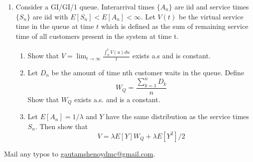 \documentclass[a4paper,10pt]{article}
\begin{document}
\begin{enumerate}
\item Consider a GI/GI/1 queue. Interarrival times $\{A_n\}$ are iid and service times $\{S_n\}$ are iid with $E[S_n] < E[A_n] < \infty$. Let $V(t)$ be the virtual service time in the queue at time $t$ which is defined as the sum of remaining service time of all customers present in the system at time t. 
\begin{enumerate}
	\item Show that $V = \lim_{t \to \infty}\frac{\int_0^t V(u)du}{t}$ exists a.s and is constant.
	\item Let $D_n$ be the amount of time nth customer waits in the queue. Define
	\[W_Q = \frac{\sum_{k=1}^n D_k}{n}\]
	Show that $W_Q$ exists a.s. and is a constant.
	\item Let $E[A_n] = 1/\lambda$ and $Y$ have the same distribution as the service times $S_n$. Then show that
	\[V = \lambda E[Y]W_Q + \lambda E[Y^2]/2\] 
\end{enumerate}

\end{enumerate}
Mail any typos to \url{gautamshenoydmc@gmail.com}.
\end{document}
